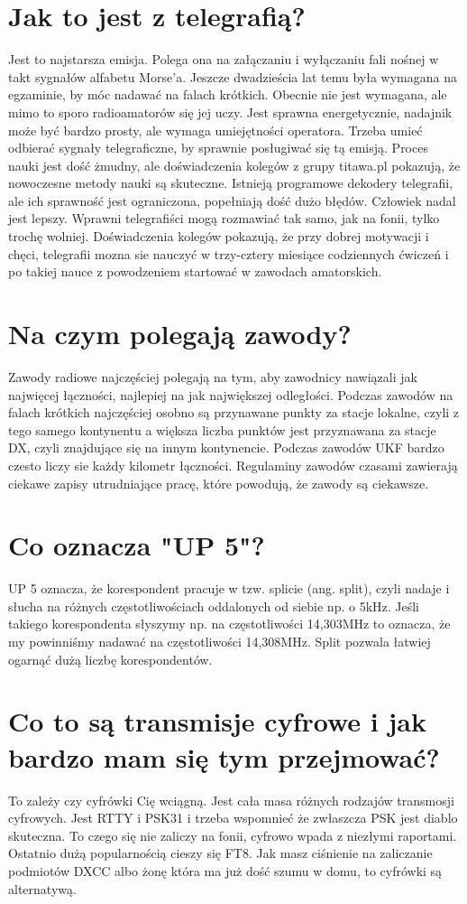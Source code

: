 \documentclass[a4paper,12pt]{article}
\begin{document}
\section{Jak to jest z telegrafią?}
Jest to najstarsza emisja. Polega ona na załączaniu i wyłączaniu fali nośnej w takt sygnałów alfabetu Morse'a. Jeszcze dwadzieścia lat temu była wymagana na egzaminie, by móc nadawać na falach krótkich. Obecnie nie jest wymagana, ale mimo to sporo radioamatorów się jej uczy. Jest sprawna energetycznie, nadajnik może być bardzo prosty, ale wymaga umiejętności operatora. Trzeba umieć odbierać sygnały telegraficzne, by sprawnie posługiwać się tą emisją. Proces nauki jest dość żmudny, ale doświadczenia kolegów z grupy titawa.pl pokazują, że nowoczesne metody nauki są skuteczne. Istnieją programowe dekodery telegrafii, ale ich sprawność jest ograniczona, popełniają dość dużo błędów. Człowiek nadal jest lepszy. Wprawni telegrafiści mogą rozmawiać tak samo, jak na fonii, tylko trochę wolniej. Doświadczenia kolegów pokazują, że przy dobrej motywacji i chęci, telegrafii mozna sie nauczyć w trzy-cztery miesiące codziennych ćwiczeń i po takiej nauce z powodzeniem startować w zawodach amatorskich.

\section{Na czym polegają zawody?}
Zawody radiowe najczęściej polegają na tym, aby zawodnicy nawiązali jak najwięcej łączności, najlepiej na jak największej odległości. Podczas zawodów na falach krótkich najczęściej osobno są przynawane punkty za stacje lokalne, czyli z tego samego kontynentu a większa liczba punktów jest przyznawana za stacje DX, czyli znajdujące się na innym kontynencie. Podczas zawodów UKF bardzo czesto liczy sie każdy kilometr łączności. Regulaminy zawodów czasami zawierają ciekawe zapisy utrudniające pracę, które powodują, że zawody są ciekawsze.  

\section{Co oznacza "UP 5"?}
UP 5 oznacza, że korespondent pracuje w tzw. splicie (ang. split), czyli nadaje i słucha na różnych częstotliwościach oddalonych od siebie np. o 5kHz. Jeśli takiego korespondenta słyszymy np. na częstotliwości 14,303MHz to oznacza, że my powinniśmy nadawać na częstotliwości 14,308MHz. Split pozwala łatwiej ogarnąć dużą liczbę korespondentów. 

\section{Co to są transmisje cyfrowe i jak bardzo mam się tym przejmować?}
To zależy czy cyfrówki Cię wciągną. 
Jest cała masa różnych rodzajów transmosji cyfrowych. Jest RTTY i PSK31 i trzeba wspomnieć że zwłaszcza PSK jest diablo skuteczna. To czego się nie zaliczy na fonii, cyfrowo wpada z niezłymi raportami. Ostatnio dużą popularnością cieszy się FT8.
Jak masz ciśnienie na zaliczanie podmiotów DXCC albo żonę która ma już dość szumu w domu, to cyfrówki są alternatywą.
\end{document}
